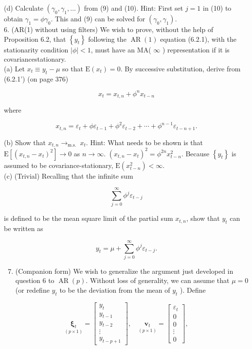 \documentclass[10pt]{article}
\begin{document}
(d) Calculate $\left(\gamma_{0}, \gamma_{1}, \ldots\right)$ from (9) and (10). Hint: First set $j=1$ in (10) to obtain $\gamma_{1}=\phi \gamma_{0}$. This and (9) can be solved for $\left(\gamma_{0}, \gamma_{1}\right)$.\\
6. (AR(1) without using filters) We wish to prove, without the help of Proposition 6.2, that $\left\{y_{t}\right\}$ following the $\operatorname{AR}(1)$ equation (6.2.1), with the stationarity condition $|\phi|<1$, must have an MA( $\infty$ ) representation if it is covariancestationary.\\
(a) Let $x_{t} \equiv y_{t}-\mu$ so that $\mathrm{E}\left(x_{t}\right)=0$. By successive substitution, derive from (6.2.1') (on page 376)

$$
x_{t}=x_{t, n}+\phi^{n} x_{t-n}
$$

where

$$
x_{t, n}=\varepsilon_{t}+\phi \varepsilon_{t-1}+\phi^{2} \varepsilon_{t-2}+\cdots+\phi^{n-1} \varepsilon_{t-n+1} .
$$

(b) Show that $x_{t, n} \rightarrow_{\text {m.s. }} x_{t}$. Hint: What needs to be shown is that $\mathrm{E}\left[\left(x_{t, n}-\right.\right. \left.\left.x_{t}\right)^{2}\right] \rightarrow 0$ as $n \rightarrow \infty$. $\left(x_{t, n}-x_{t}\right)^{2}=\phi^{2 n} x_{t-n}^{2}$. Because $\left\{y_{t}\right\}$ is assumed to be covariance-stationary, $\mathrm{E}\left(x_{t-n}^{2}\right)<\infty$.\\
(c) (Trivial) Recalling that the infinite sum

$$
\sum_{j=0}^{\infty} \phi^{j} \varepsilon_{t-j}
$$

is defined to be the mean square limit of the partial sum $x_{t, n}$, show that $y_{t}$ can be written as

$$
y_{t}=\mu+\sum_{j=0}^{\infty} \phi^{j} \varepsilon_{t-j} .
$$

\begin{enumerate}
  \setcounter{enumi}{6}
  \item (Companion form) We wish to generalize the argument just developed in question 6 to $\operatorname{AR}(p)$. Without loss of generality, we can assume that $\mu=0$ (or redefine $y_{t}$ to be the deviation from the mean of $y_{t}$ ). Define
\end{enumerate}

$$
\underset{(p \times 1)}{\boldsymbol{\xi}_{t}}=\left[\begin{array}{c}
y_{t} \\
y_{t-1} \\
y_{t-2} \\
\vdots \\
y_{t-p+1}
\end{array}\right], \quad \underset{(p \times 1)}{\mathbf{v}_{t}}=\left[\begin{array}{c}
\varepsilon_{t} \\
0 \\
0 \\
\vdots \\
0
\end{array}\right],
$$
\end{document}
